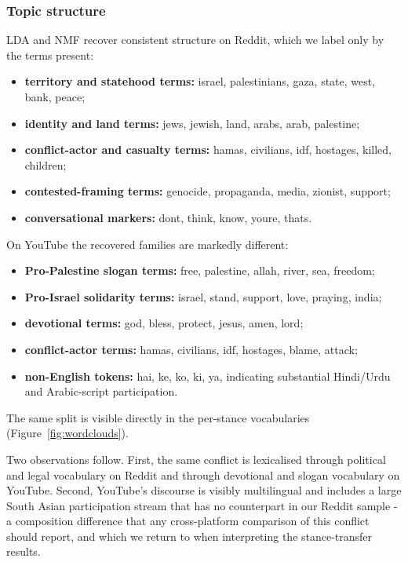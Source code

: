 \subsubsection*{Topic structure}
LDA and NMF recover consistent structure on Reddit, which we label only by the
terms present:
\begin{itemize}[leftmargin=1.2em,itemsep=1pt,topsep=2pt]
  \item \textbf{territory and statehood terms:} israel, palestinians, gaza, state, west, bank, peace;
  \item \textbf{identity and land terms:} jews, jewish, land, arabs, arab, palestine;
  \item \textbf{conflict-actor and casualty terms:} hamas, civilians, idf, hostages, killed, children;
  \item \textbf{contested-framing terms:} genocide, propaganda, media, zionist, support;
  \item \textbf{conversational markers:} dont, think, know, youre, thats.
\end{itemize}
On YouTube the recovered families are markedly different:
\begin{itemize}[leftmargin=1.2em,itemsep=1pt,topsep=2pt]
  \item \textbf{Pro-Palestine slogan terms:} free, palestine, allah, river, sea, freedom;
  \item \textbf{Pro-Israel solidarity terms:} israel, stand, support, love, praying, india;
  \item \textbf{devotional terms:} god, bless, protect, jesus, amen, lord;
  \item \textbf{conflict-actor terms:} hamas, civilians, idf, hostages, blame, attack;
  \item \textbf{non-English tokens:} hai, ke, ko, ki, ya, indicating substantial
  Hindi/Urdu and Arabic-script participation.
\end{itemize}
The same split is visible directly in the per-stance vocabularies
(Figure~\ref{fig:wordclouds}).

Two observations follow. First, the same conflict is lexicalised through political
and legal vocabulary on Reddit and through devotional and slogan vocabulary on
YouTube. Second, YouTube's discourse is visibly multilingual and includes a large
South Asian participation stream that has no counterpart in our Reddit sample - a
composition difference that any cross-platform comparison of this conflict should
report, and which we return to when interpreting the stance-transfer results.

